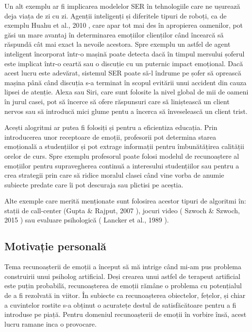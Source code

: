 \documentclass[a4paper,12pt]{book}
\begin{document}
					Un alt exemplu ar fi implicarea modelelor SER în tehnologiile care ne ușurează deja viața de zi cu zi. Agenții inteligenți și diferitele tipuri de roboți, ca de exemplu Huahu et al., 2010 \cite{huahu}, care apar tot mai des în apropierea oamenilor, pot găsi un mare avantaj în determinarea emoțiilor clienților când încearcă să răspundă cât mai exact la nevoile acestora. Spre exemplu un astfel de agent inteligent încorporat într-o mașină poate detecta dacă în timpul mersului șoferul este implicat într-o ceartă sau o discuție cu un puternic impact emoțional. Dacă acest lucru este adevărat, sistemul SER poate să-l îndrume pe șofer să oprească mașina până când discuția s-a terminat în scopul evitării unui accident din cauza lipsei de atenție. Alexa sau Siri, care sunt folosite la nivel  global de mii de oameni în jurul casei, pot să încerce să ofere răspunsuri care să liniștească un client nervos sau să introducă mici glume pentu a încerca să înveselească un client trist.\par 
					
					Acești alogritmi ar putea fi folosiți și pentru a eficientiza educația. Prin introducerea unor receptoare de emoții, profesorii pot determina starea emoțională a studențiilor și pot extrage informații pentru îmbunătățirea calității orelor de curs. Spre exemplu profesorul poate folosi modelul de recunoaștere al emoțiilor pentru supravegherea continuă a interesului studențiilor sau pentru a crea strategii prin care să ridice moralul clasei când vine vorba de anumie subiecte predate care îi pot descuraja sau plictisi pe aceștia. \par
					
					Alte exemple care merită menționate sunt folosirea acestor tipuri de algoritmi în: stații de call-center (Gupta \& Rajput, 2007 \cite{gupta}), jocuri video ( Szwoch \& Szwoch, 2015 \cite{szwoch}) sau evaluare psihologică ( Lancker et al., 1989 \cite{lancker} ). \par 							
			\subsection{Motivație personală}				
					Tema recunoașterii de emoții a început să mă intrige când mi-am pus problema construirii unui psiholog artificial. Deși crearea unui astfel de terapeut artificial este puțin probabilă, recunoașterea de emoții rămâne o problema cu potențialul de a fi rezolvată in viitor. În subiecte ca recunoașterea obiectelor, fețelor, și chiar a cuvintelor rostite s-a obținut o acuratețe destul de satisfăcătoare pentru a fi introduse pe piață. Pentru domeniul recunoașterii de emoții în vorbire însă, acest lucru ramane inca o provocare. \par
					
\end{document}
